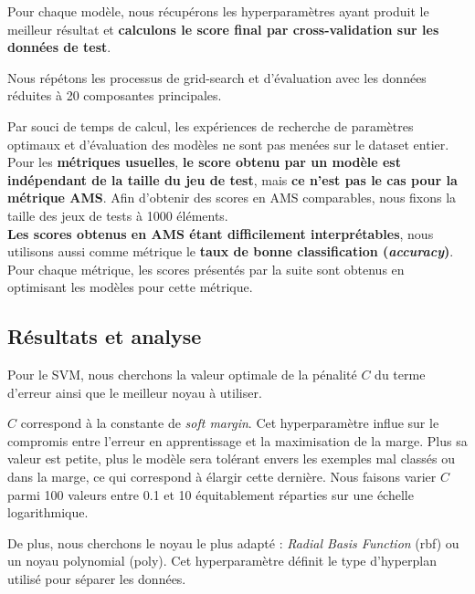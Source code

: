 \documentclass[12pt]{article}
\begin{document}
Pour chaque modèle, nous récupérons les hyperparamètres ayant produit le
meilleur résultat et \textbf{calculons le score final par cross-validation sur les
données de test}. \\

\begin{mdframed}[hidealllines=true,backgroundcolor=blue!20] Nous répétons les
processus de grid-search et d'évaluation avec les données réduites à 20
composantes principales.  \\ \end{mdframed}

Par souci de temps de calcul, les expériences de recherche de paramètres
optimaux et d'évaluation des modèles ne sont pas menées sur le dataset entier.
Pour les \textbf{métriques usuelles}, \textbf{le score obtenu par un modèle est
indépendant de la taille du jeu de test}, mais \textbf{ce n'est pas le cas pour
la métrique AMS}.  Afin d'obtenir des scores en AMS comparables, nous fixons la
taille des jeux de tests à 1000 éléments. \\

\textbf{Les scores obtenus en AMS étant difficilement interprétables}, nous
utilisons aussi comme métrique le \textbf{taux de bonne classification
(\emph{accuracy})}. Pour chaque métrique, les scores présentés par la suite sont
obtenus en optimisant les modèles pour cette métrique.

\subsection{Résultats et analyse}

Pour le SVM, nous cherchons la valeur optimale de la pénalité $C$ du terme
d'erreur ainsi que le meilleur noyau à utiliser. 

$C$ correspond à la constante de \emph{soft margin}. Cet hyperparamètre influe
sur le compromis entre l'erreur en apprentissage et la maximisation de la marge.
Plus sa valeur est petite, plus le modèle sera tolérant envers les exemples mal
classés ou dans la marge, ce qui correspond à élargir cette dernière. Nous
faisons varier $C$ parmi 100 valeurs entre 0.1 et 10 équitablement réparties sur
une échelle logarithmique.

De plus, nous cherchons le noyau le plus adapté : \emph{Radial Basis Function}
(rbf) ou un noyau polynomial (poly). Cet hyperparamètre définit le type
d'hyperplan utilisé pour séparer les données.  \\
\end{document}
